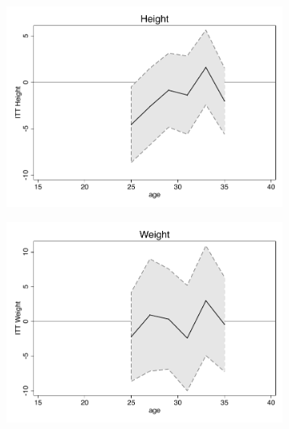 \documentclass[a4paper ]{article}
\begin{document}
\clearpage
\newpage
\begin{figure}[p]
\begin{subfigure}[h]{0.48\textwidth}\centering
	\includegraphics[width=\textwidth]{../../analysis/graphs/SOEP/Height_LC.pdf}
\end{subfigure}
\quad
\begin{subfigure}[h]{0.48\textwidth}\centering
	\includegraphics[width=\textwidth]{../../analysis/graphs/SOEP/Weight_LC.pdf}
\end{subfigure}


\end{figure}
\end{document}
